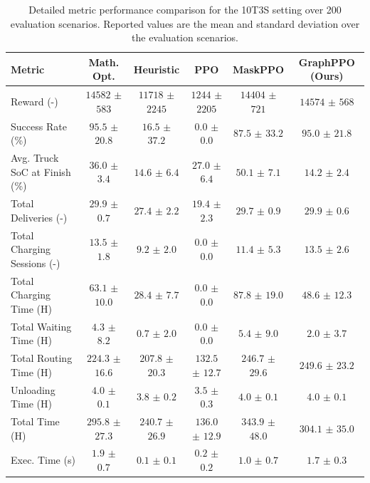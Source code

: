 \documentclass[journal]{IEEEtran}
\begin{document}
\begin{table}[t]
\centering
\small
\caption{Detailed metric performance comparison for the 10T3S setting over 200 evaluation scenarios. Reported values are the mean and standard deviation over the evaluation scenarios.}
\begin{tabular}{@{}lccccc@{}}
\toprule
Metric & Math. Opt. & Heuristic & PPO & MaskPPO & GraphPPO (Ours) \\
\midrule
Reward (-) & $14582$ $\pm$ $583$ & $11718$ $\pm$ $2245$ & $1244$ $\pm$ $2205$ & $14404$ $\pm$ $721$ & $14574$ $\pm$ $568$ \\
Success Rate (\%) & $95.5$ $\pm$ $20.8$ & $16.5$ $\pm$ $37.2$ & $0.0$ $\pm$ $0.0$ & $87.5$ $\pm$ $33.2$ & $95.0$ $\pm$ $21.8$ \\
Avg. Truck SoC at Finish (\%) & $36.0$ $\pm$ $3.4$ & $14.6$ $\pm$ $6.4$ & $27.0$ $\pm$ $6.4$ & $50.1$ $\pm$ $7.1$ & $14.2$ $\pm$ $2.4$ \\
Total Deliveries (-) & $29.9$ $\pm$ $0.7$ & $27.4$ $\pm$ $2.2$ & $19.4$ $\pm$ $2.3$ & $29.7$ $\pm$ $0.9$ & $29.9$ $\pm$ $0.6$ \\
Total Charging Sessions (-) & $13.5$ $\pm$ $1.8$ & $9.2$ $\pm$ $2.0$ & $0.0$ $\pm$ $0.0$ & $11.4$ $\pm$ $5.3$ & $13.5$ $\pm$ $2.6$ \\
\midrule
Total Charging Time (H) & $63.1$ $\pm$ $10.0$ & $28.4$ $\pm$ $7.7$ & $0.0$ $\pm$ $0.0$ & $87.8$ $\pm$ $19.0$ & $48.6$ $\pm$ $12.3$ \\
Total Waiting Time (H) & $4.3$ $\pm$ $8.2$ & $0.7$ $\pm$ $2.0$ & $0.0$ $\pm$ $0.0$ & $5.4$ $\pm$ $9.0$ & $2.0$ $\pm$ $3.7$ \\
Total Routing Time (H) & $224.3$ $\pm$ $16.6$ & $207.8$ $\pm$ $20.3$ & $132.5$ $\pm$ $12.7$ & $246.7$ $\pm$ $29.6$ & $249.6$ $\pm$ $23.2$ \\
Unloading Time (H)& $4.0$ $\pm$ $0.1$ & $3.8$ $\pm$ $0.2$ & $3.5$ $\pm$ $0.3$ & $4.0$ $\pm$ $0.1$ & $4.0$ $\pm$ $0.1$ \\
Total Time (H) & $295.8$ $\pm$ $27.3$ & $240.7$ $\pm$ $26.9$ & $136.0$ $\pm$ $12.9$ & $343.9$ $\pm$ $48.0$ & $304.1$ $\pm$ $35.0$ \\
\midrule
Exec. Time (s) & $1.9$ $\pm$ $0.7$ & $0.1$ $\pm$ $0.1$ & $0.2$ $\pm$ $0.2$ & $1.0$ $\pm$ $0.7$ & $1.7$ $\pm$ $0.3$ \\
\bottomrule
\end{tabular}
\label{tab:10t3s_metrics}
\end{table}
\end{document}

